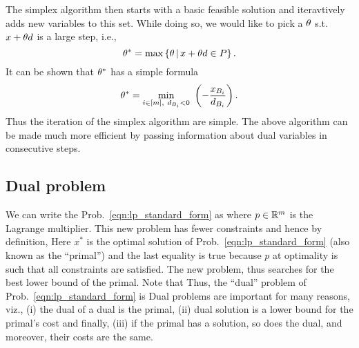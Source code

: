 \documentclass[letterpaper, 10pt, twocolumn, reqno]{amsart}
\begin{document}
The simplex algorithm then starts with a basic feasible solution and iteravtively adds new variables to this set. While doing so, we would like to pick a $\theta$ s.t. $x+\theta d$ is a large step, i.e.,
$$
\theta^* = \max \left\{\theta \, \vert \, x + \theta d \in P\right\}.
$$
It can be shown that $\theta^*$ has a simple formula
$$
\th^* = \min_{i \in [m],\ d_{B_i} < 0}\ \rbrac{- \f{x_{B_i}}{d_{B_i}}}.
$$
Thus the iteration of the simplex algorithm are simple.
The above algorithm can be made much more efficient by passing information about dual variables in consecutive steps.

\subsection{Dual problem}
\label{ssec:dual}

We can write the Prob.~\eqref{eqn:lp_standard_form} as
where $p \in \mathbb{R}^m$ is the Lagrange multiplier. This new problem has fewer constraints and hence by definition,
Here $x^*$ is the optimal solution of Prob.~\eqref{eqn:lp_standard_form} (also known as the ``primal'') and the last equality is true because $p$ at optimality is such that all constraints are satisfied. The new problem,
thus searches for the best lower bound of the primal. Note that
Thus, the ``dual'' problem of Prob.~\eqref{eqn:lp_standard_form} is
Dual problems are important for many reasons, viz., (i) the dual of a dual is the primal, (ii) dual solution is a lower bound for the primal's cost and finally, (iii) if the primal has a solution, so does the dual, and moreover, their costs are the same.
\end{document}
